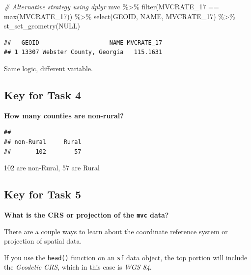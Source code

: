 \documentclass[
]{book}
\newenvironment{Shaded}{\begin{snugshade}}{\end{snugshade}}
\newcommand{\CommentTok}[1]{\textcolor[rgb]{0.56,0.35,0.01}{\textit{#1}}}
\newcommand{\ConstantTok}[1]{\textcolor[rgb]{0.00,0.00,0.00}{#1}}
\newcommand{\FunctionTok}[1]{\textcolor[rgb]{0.00,0.00,0.00}{#1}}
\newcommand{\NormalTok}[1]{#1}
\newcommand{\SpecialCharTok}[1]{\textcolor[rgb]{0.00,0.00,0.00}{#1}}
\begin{document}
\begin{Shaded}
\begin{Highlighting}[]
\CommentTok{\# Alternative strategy using dplyr}
\NormalTok{mvc }\SpecialCharTok{\%\textgreater{}\%}
  \FunctionTok{filter}\NormalTok{(MVCRATE\_17 }\SpecialCharTok{==} \FunctionTok{max}\NormalTok{(MVCRATE\_17)) }\SpecialCharTok{\%\textgreater{}\%}
  \FunctionTok{select}\NormalTok{(GEOID, NAME, MVCRATE\_17) }\SpecialCharTok{\%\textgreater{}\%}
  \FunctionTok{st\_set\_geometry}\NormalTok{(}\ConstantTok{NULL}\NormalTok{)}
\end{Highlighting}
\end{Shaded}

\begin{verbatim}
##   GEOID                    NAME MVCRATE_17
## 1 13307 Webster County, Georgia   115.1631
\end{verbatim}

Same logic, different variable.

\hypertarget{key-for-task-4}{%
\subsection{Key for Task 4}\label{key-for-task-4}}

\textbf{How many counties are non-rural?}

\begin{Shaded}
\end{Shaded}

\begin{verbatim}
## 
## non-Rural     Rural 
##       102        57
\end{verbatim}

102 are non-Rural, 57 are Rural

\hypertarget{key-for-task-5}{%
\subsection{Key for Task 5}\label{key-for-task-5}}

\textbf{What is the CRS or projection of the \texttt{mvc} data?}

There are a couple ways to learn about the coordinate reference system or projection of spatial data.

If you use the \texttt{head()} function on an \texttt{sf} data object, the top portion will include the \emph{Geodetic CRS}, which in this case is \emph{WGS 84}.
\end{document}
